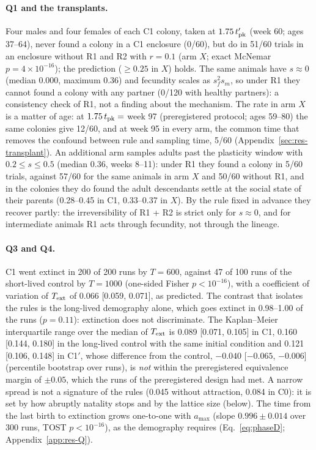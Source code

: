 \paragraph{Q1 and the transplants.}
Four males and four females of each \textsf{C1} colony, taken at $1.75\,t'_{\rm pk}$ (week 60; ages 37--64), never
found a colony in a \textsf{C1} enclosure (0/60), but do in 51/60 trials in an enclosure without R1 and R2 with
$r=0.1$ (arm $X$; exact McNemar $p=4\times10^{-16}$); the prediction ($\ge0.25$ in $X$) holds. The same animals have
$s\approx0$ (median 0.000, maximum 0.36) and fecundity scales as $s_f^2s_m$, so under R1 they cannot found a colony
with any partner (0/120 with healthy partners): a consistency check of R1, not a finding about the mechanism. The
rate in arm $X$ is a matter of age: at $1.75\,t_{\rm pk}=$ week 97 (preregistered protocol; ages 59--80) the same
colonies give 12/60, and at week 95 in every arm, the common time that removes the confound between rule and
sampling time, 5/60 (Appendix~\ref{sec:res-transplant}). An additional arm samples adults past the plasticity window with
$0.2\le s\le0.5$ (median 0.36, weeks 8--11): under R1 they found a colony in 5/60 trials, against 57/60 for the same
animals in arm $X$ and 50/60 without R1, and in the colonies they do found the adult descendants settle at the
social state of their parents (0.28--0.45 in \textsf{C1}, 0.33--0.37 in $X$). By the rule fixed in advance they
recover partly: the irreversibility of R1 + R2 is strict only for $s\approx0$, and for intermediate animals R1
acts through fecundity, not through the lineage.

\paragraph{Q3 and Q4.}
\textsf{C1} went extinct in 200 of 200 runs by $T=600$, against 47 of 100 runs of the short-lived control by $T=1000$ (one-sided
Fisher $p<10^{-16}$), with a coefficient of variation of $T_{\rm ext}$ of 0.066 [0.059, 0.071], as predicted. The
contrast that isolates the rules is the long-lived demography alone, which goes extinct in 0.98--1.00 of the runs
($p=0.11$): extinction does not discriminate. The Kaplan--Meier interquartile range over the median of
$T_{\rm ext}$ is 0.089 [0.071, 0.105] in \textsf{C1}, 0.160 [0.144, 0.180] in the long-lived control with the same
initial condition and 0.121 [0.106, 0.148] in \textsf{C1}$'$, whose difference from the control, $-0.040$
[$-0.065$, $-0.006$] (percentile bootstrap over runs), is \emph{not} within the preregistered equivalence margin of $\pm0.05$, which the runs of the preregistered design had met. A narrow
spread is not a signature of the rules (0.045 without attraction, 0.084 in \textsf{C0}): it is set by how abruptly
natality stops and by the lattice size (below). The time from the last birth to extinction grows one-to-one with
$a_{\max}$ (slope $0.996\pm0.014$ over 300 runs, TOST $p<10^{-16}$), as the demography requires
(Eq.~\eqref{eq:phaseD}; Appendix~\ref{app:res-Q}).

